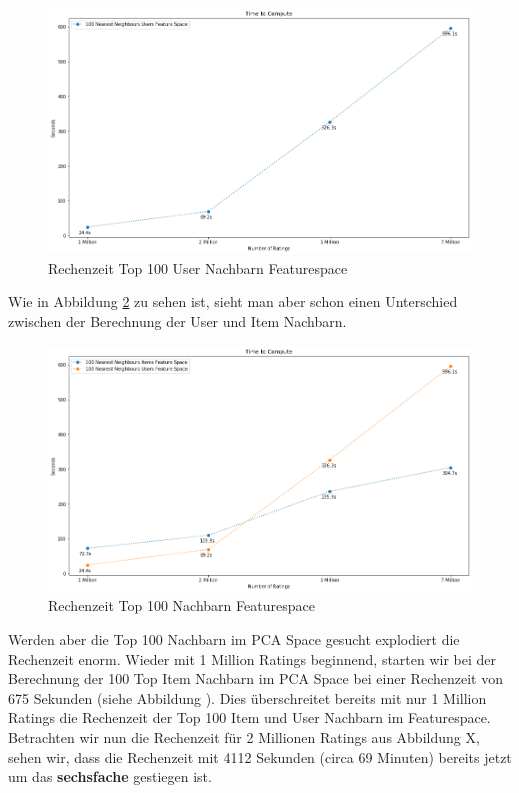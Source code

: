 \begin{figure}[h!tb]
	\centering
	\includegraphics[keepaspectratio,width=\linewidth]{img/Time to Compute User Featurespace.png} 
	\caption{Rechenzeit Top 100 User Nachbarn Featurespace}
	\label{fig:Rechenzeit Usernachbarn Featurespace}
\end{figure}
Wie in Abbildung \ref{fig:Rechenzeit Featurespace} zu sehen ist, sieht man aber schon einen Unterschied zwischen der Berechnung der User und Item Nachbarn.
\begin{figure}[h!tb]
	\centering
	\includegraphics[keepaspectratio,width=\linewidth]{img/Time to Compute Featurespace.png} 
	\caption{Rechenzeit Top 100 Nachbarn Featurespace}
	\label{fig:Rechenzeit Featurespace}
\end{figure}

Werden aber die Top 100 Nachbarn im PCA Space gesucht explodiert die Rechenzeit enorm. Wieder mit 1 Million Ratings beginnend, starten wir bei der Berechnung der 100 Top Item Nachbarn im PCA Space bei einer Rechenzeit von 675 Sekunden (siehe Abbildung ). Dies überschreitet bereits mit nur 1 Million Ratings die Rechenzeit der Top 100 Item und User Nachbarn im Featurespace. Betrachten wir nun die Rechenzeit für 2 Millionen Ratings aus Abbildung X, sehen wir, dass die Rechenzeit mit 4112 Sekunden (circa 69 Minuten) bereits jetzt um das \textbf{sechsfache} gestiegen ist.

